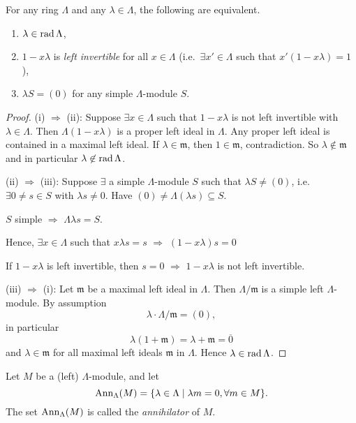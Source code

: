 \begin{prop}\label{prop:radcharacterization}
For any ring $\Lambda$ and any $\lambda\in\Lambda$, the following are
equivalent.
\begin{enumerate}[\rm(i)]
\item $\lambda\in\operatorname{rad}\nolimits\Lambda$, 
\item $1 - x\lambda$ is \emph{left invertible} for all $x\in \Lambda$
  (i.e.\ $\exists x'\in\Lambda$ such that $x'(1-x\lambda) = 1$), 
\item $\lambda S = (0)$ for any simple $\Lambda$-module $S$.
\end{enumerate}
\end{prop}
\begin{proof}
(i) $\Rightarrow$ (ii): Suppose $\exists x \in \Lambda$ such that $1 -
x\lambda$ is not left invertible with $\lambda\in\Lambda$.  Then
$\Lambda(1 - x\lambda)$ is a proper left ideal in $\Lambda$.  Any
proper left ideal is contained in a maximal left ideal.  If
$\lambda\in\mathfrak{m}$, then $1\in\mathfrak{m}$, contradiction. So
$\lambda\not\in\mathfrak{m}$ and in particular
$\lambda\not\in\operatorname{rad}\nolimits\Lambda$. 

(ii) $\Rightarrow$ (iii): Suppose $\exists$ a simple $\Lambda$-module
$S$ such that $\lambda S \neq (0)$, i.e.\ $\exists 0\neq s \in S$ with
$\lambda s \neq 0$.  Have $(0)\neq \Lambda(\lambda s)\subseteq S$.  

$S$ simple $\Rightarrow$ $\Lambda \lambda s = S$.

Hence, $\exists x \in \Lambda$ such that $x\lambda s = s$
$\Rightarrow$ $(1 - x\lambda) s = 0$

If $1 - x\lambda$ is left invertible, then $s=0$ $\Rightarrow$
$1-x\lambda$ is not left invertible.

(iii) $\Rightarrow$ (i): Let $\mathfrak{m}$ be a maximal left ideal in
$\Lambda$.  Then $\Lambda/\mathfrak{m}$ is a simple left
$\Lambda$-module.  By assumption
\[\lambda\cdot \Lambda/\mathfrak{m} = (0),\]
in particular
\[\lambda(1 + \mathfrak{m}) = \lambda + \mathfrak{m} = \overline{0}\]
and $\lambda\in\mathfrak{m}$ for all maximal left ideals
$\mathfrak{m}$ in $\Lambda$.   Hence $\lambda\in\operatorname{rad}\nolimits\Lambda$. 
\end{proof}

\begin{defin}
Let $M$ be a (left) $\Lambda$-module, and let 
\[\operatorname{Ann}\nolimits_\Lambda(M) = \{\lambda\in\Lambda\mid \lambda m = 0, \forall
  m\in M\}.\]
The set $\operatorname{Ann}\nolimits_\Lambda(M)$ is called the
\emph{annihilator} of
$M$. 
\end{defin}


